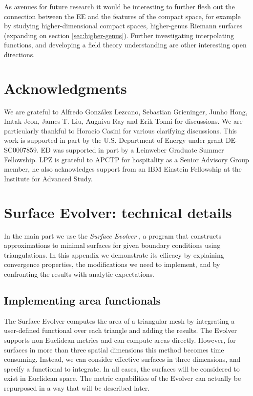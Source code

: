 \documentclass[11 pt]{article}
\begin{document}
As avenues for future research it would be interesting to further flesh out the connection between the EE and the features of the compact space, for example by studying higher-dimensional compact spaces, higher-genus Riemann surfaces (expanding on section \ref{sec:higher-genus}). Further investigating interpolating functions, and developing a  field theory understanding are other interesting open directions. 

 


\section*{Acknowledgments}
We are grateful to  Alfredo Gonz\'alez Lezcano, Sebastian Grieninger,  Junho Hong, Imtak Jeon, James T. Liu, Augniva Ray and  Erik Tonni for discussions. We are particularly thankful to Horacio Casini for various clarifying discussions. This work is supported in part by the U.S. Department of Energy under grant DE-SC0007859. ED was supported in part by a Leinweber Graduate Summer  Fellowship. LPZ is grateful to APCTP for hospitality as a Senior Advisory Group member, he also  acknowledges support from an IBM Einstein Fellowship at the Institute for Advanced Study.


\appendix

\section{Surface Evolver: technical details}\label{App:SurfaceEvolver}
In the main part we use the \textit{Surface Evolver} \cite{Brakke,Brakke1992}, a program that constructs approximations to minimal surfaces for given boundary conditions using triangulations. In this appendix we demonstrate its efficacy by explaining convergence properties, the modifications we need to implement, and by confronting the results  with analytic expectations.

\subsection{Implementing area functionals} \label{sec:area functional}
The Surface Evolver computes the area of a triangular mesh by integrating a user-defined functional over each triangle and adding the results. The Evolver supports non-Euclidean metrics and can compute areas directly. However, for surfaces in more than three spatial dimensions this method becomes time consuming. Instead, we can consider effective surfaces in three dimensions, and specify a functional to integrate. In all cases, the surfaces will be considered to exist in Euclidean space. The metric capabilities of the Evolver can actually be repurposed in a way that will be described later.
\end{document}
